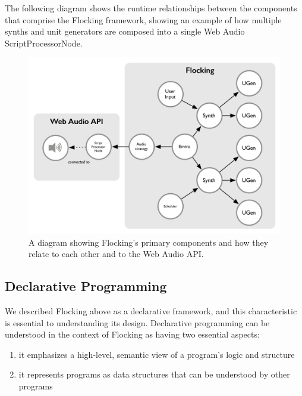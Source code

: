 \documentclass{article}
\begin{document}
The following diagram shows the runtime relationships between the components that comprise the Flocking framework, showing an example of how multiple synths and unit generators are composed into a single Web Audio ScriptProcessorNode.

\begin{figure}[h]
\centering
\includegraphics[width=0.9\columnwidth]{images/flocking-component-architecture.png}
\caption{ A diagram showing Flocking's primary components and how they relate to each other and to the Web Audio API.\label{fig:architecture}}
\end{figure}

\subsection{Declarative Programming}

We described Flocking above as a declarative framework, and this characteristic is essential to understanding its design. Declarative programming can be understood in the context of Flocking as having two essential aspects:

\begin{enumerate}
\item it emphasizes a high-level, semantic view of a program’s logic and structure
\item it represents programs as data structures that can be understood by other programs
\end{enumerate}
\end{document}

